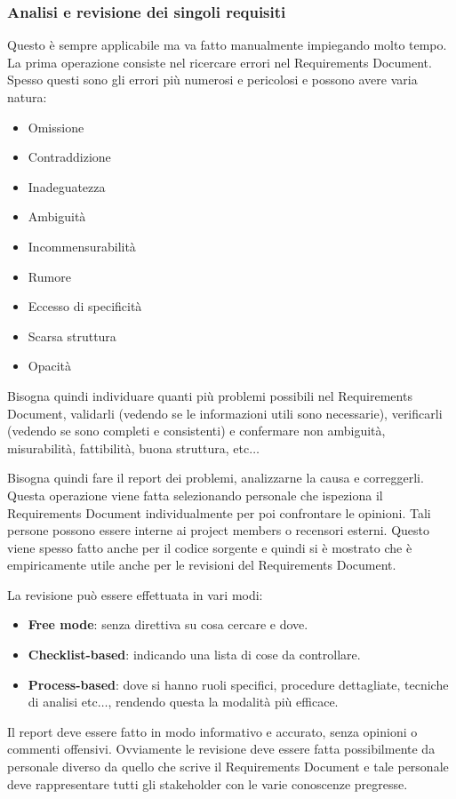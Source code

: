 \subsubsection{Analisi e revisione dei singoli requisiti}
Questo è sempre applicabile ma va fatto manualmente impiegando molto tempo. La
prima operazione consiste nel ricercare errori nel Requirements Document. Spesso
questi sono gli errori più numerosi e pericolosi e possono avere varia natura:
\begin{itemize}
      \item Omissione
      \item Contraddizione
      \item Inadeguatezza
      \item Ambiguità
      \item Incommensurabilità
      \item Rumore
      \item Eccesso di specificità
      \item Scarsa struttura
      \item Opacità
\end{itemize}
Bisogna quindi individuare quanti più problemi possibili nel Requirements Document,
validarli (vedendo se le informazioni utili sono necessarie), verificarli (vedendo
se sono completi e consistenti) e confermare non ambiguità, misurabilità,
fattibilità, buona struttura, etc$\dots$

Bisogna quindi fare il report dei problemi, analizzarne la causa e correggerli.
Questa operazione viene fatta selezionando personale che ispeziona il Requirements
Document individualmente per poi confrontare le opinioni. Tali persone possono
essere interne ai project members o recensori esterni. Questo viene spesso fatto
anche per il codice sorgente e quindi si è mostrato che è empiricamente utile
anche per le revisioni del Requirements Document.

La revisione può essere effettuata in vari modi:
\begin{itemize}
      \item \textbf{Free mode}: senza direttiva su cosa cercare e dove.
      \item \textbf{Checklist-based}: indicando una lista di cose da controllare.
      \item \textbf{Process-based}: dove si hanno ruoli specifici, procedure
            dettagliate, tecniche di analisi etc$\dots$, rendendo questa la
            modalità più efficace.
\end{itemize}
Il report deve essere fatto in modo informativo e accurato, senza opinioni o
commenti offensivi. Ovviamente le revisione deve essere fatta possibilmente da
personale diverso da quello che scrive il Requirements Document e tale personale
deve rappresentare tutti gli stakeholder con le varie conoscenze pregresse.

